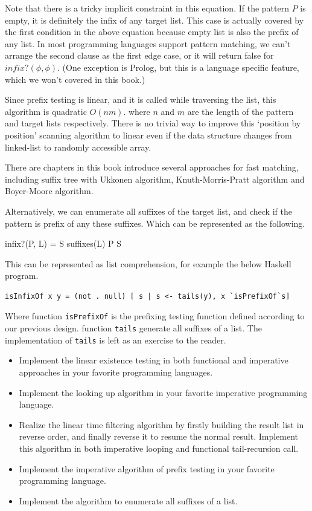 \documentclass[b5paper]{article}
\begin{document}
Note that there is a tricky implicit constraint in this equation. If the pattern $P$ is empty,
it is definitely the infix of any target list. This case is actually covered by the first condition
in the above equation because empty list is also the prefix of any list. In most programming languages
support pattern matching, we can't arrange the second clause as the first edge case, or it will
return false for $infix?(\phi, \phi)$. (One exception is Prolog, but this is a language specific
feature, which we won't covered in this book.)

Since prefix testing is linear, and it is called while traversing the list, this algorithm
is quadratic $O(nm)$. where $n$ and $m$ are the length of the pattern and target lists respectively.
There is no trivial way to improve this `position by position' scanning algorithm to linear
even if the data structure changes from linked-list to randomly accessible array.

There are chapters in this book introduce several approaches for fast matching, including
suffix tree with Ukkonen algorithm, Knuth-Morris-Pratt algorithm and Boyer-Moore algorithm.

Alternatively, we can enumerate all suffixes of the target list, and check if the pattern
is prefix of any these suffixes. Which can be represented as the following.

\be
infix?(P, L) = \exists S \in suffixes(L) \land P \subseteq S
\ee

This can be represented as list comprehension, for example the below Haskell program.

\lstset{language=Haskell}
\begin{lstlisting}
isInfixOf x y = (not . null) [ s | s <- tails(y), x `isPrefixOf`s]
\end{lstlisting}

Where function \texttt{isPrefixOf} is the prefixing testing function defined according to
our previous design. function \texttt{tails} generate all suffixes of a list. The implementation
of \texttt{tails} is left as an exercise to the reader.

\begin{Exercise}
\begin{itemize}
\item Implement the linear existence testing in both functional and imperative approaches in
your favorite programming languages.
\item Implement the looking up algorithm in your favorite imperative programming language.
\item Realize the linear time filtering algorithm by firstly building the result list in reverse
order, and finally reverse it to resume the normal result. Implement this algorithm in both
imperative looping and functional tail-recursion call.
\item Implement the imperative algorithm of prefix testing in your favorite programming language.
\item Implement the algorithm to enumerate all suffixes of a list.
\end{itemize}
\end{Exercise}
\end{document}
